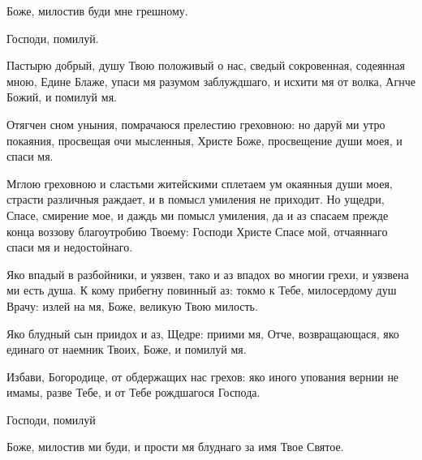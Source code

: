 \begin{mymulticols}


Боже, милостив буди мне грешному.



\TsariuNebesnyj

\TrisviatoePoOtcheNash

Господи, помилуй. 

\slavainynen

\priiditepoklonimsia


\PsalmFifty



Пастырю добрый, душу Твою положивый о нас, сведый сокровенная, содеянная мною, Едине Блаже, упаси мя разумом заблуждшаго, и исхити мя от волка, Агнче Божий, и помилуй мя.


Отягчен сном уныния, помрачаюся прелестию греховною: но даруй ми утро покаяния, просвещая очи мысленныя, Христе Боже, просвещение души моея, и спаси мя.


Мглою греховною и сластьми житейскими сплетаем ум окаянныя души моея, страсти различныя раждает, и в помысл умиления не приходит. Но ущедри, Спасе, смирение мое, и даждь ми помысл умиления, да и аз спасаем прежде конца воззову благоутробию Твоему: Господи Христе Спасе мой, отчаяннаго спаси мя и недостойнаго.


Яко впадый в разбойники, и уязвен, тако и аз впадох во многии грехи, и уязвена ми есть душа. К кому прибегну повинный аз: токмо к Тебе, милосердому душ Врачу: излей на мя, Боже, великую Твою милость.


\slava

Яко блудный сын приидох и аз, Щедре: приими мя, Отче, возвращающася, яко единаго от наемник Твоих, Боже, и помилуй мя.

\inyne

 Избави, Богородице, от обдержащих нас грехов: яко иного упования вернии не имамы, разве Тебе, и от Тебе рождшагося Господа.


Господи, помилуй 



Боже, милостив ми буди, и прости мя блуднаго за имя Твое Святое.



\end{mymulticols}
